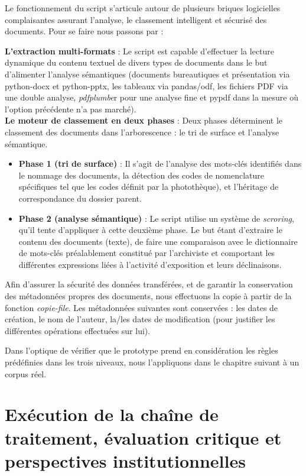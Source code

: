 Le fonctionnement du script s'articule autour de plusieurs briques logicielles complaisantes assurant l'analyse, le classement intelligent et sécurisé des documents. Pour se faire nous passons par : 


\textbf{L'extraction multi-formats} : Le script est capable d'effectuer la lecture dynamique du contenu textuel de divers types de documents dans le but d'alimenter l'analyse sémantiques (documents bureautiques et présentation via python-docx et python-pptx, les tableaux via pandas/odf, les fichiers PDF via une double analyse, \textit{pdfplumbe}r pour une analyse fine et pypdf dans la mesure où l'option précédente n'a pas marché).\\[0.1cm]

\textbf{Le moteur de classement en deux phases} : Deux phases déterminent le classement des documents dans l'arborescence : le tri de surface et l'analyse sémantique.

\begin{itemize}[label=---]
	\item \textbf{Phase 1 (tri de surface)} : Il s'agit de l'analyse des mots-clés identifiés dans le nommage des documents, la détection des codes de nomenclature spécifiques tel que les codes définit par la photothèque), et l'héritage de correspondance du dossier parent.
	\item \textbf{Phase 2 (analyse sémantique) }: Le script utilise un système de \textit{scroring}, qu'il tente d'appliquer à cette deuxième phase. Le but étant d'extraire le contenu des documents (texte), de faire une comparaison avec le dictionnaire de mots-clés préalablement constitué par l'archiviste et comportant les différentes expressions liées à l'activité d'exposition et leurs déclinaisons. 
\end{itemize}


Afin d'assurer la sécurité des données transférées, et de garantir la conservation des métadonnées propres des documents, nous effectuons la copie à partir de la fonction \textit{copie-file}. Les métadonnées suivantes sont conservées : les dates de création, le nom de l'auteur, la/les dates de modification (pour justifier les différentes opérations effectuées sur lui). 

Dans l'optique de vérifier que le prototype prend en considération les règles prédéfinies dans les trois niveaux, nous l’appliquons dans le chapitre suivant à un corpus réel.


\chapter{Exécution de la chaîne de traitement, évaluation critique et perspectives institutionnelles}


